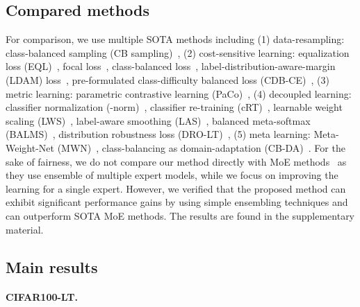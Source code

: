 \documentclass[10pt,twocolumn,letterpaper]{article}
\begin{document}
\subsection{Compared methods}
For comparison, we use multiple SOTA methods including (1) data-resampling: class-balanced sampling (CB sampling)~\cite{decoupling}, (2) cost-sensitive learning: equalization loss (EQL)~\cite{eqlloss}, focal loss~\cite{focalloss}, class-balanced loss~\cite{classbalancedloss}, label-distribution-aware-margin (LDAM) loss~\cite{ldam-drw}, pre-formulated class-difficulty balanced loss (CDB-CE)~\cite{cdb-ce}, (3) metric learning: parametric contrastive learning (PaCo)~\cite{PaCo}, (4) decoupled learning: classifier normalization (-norm)~\cite{decoupling}, classifier re-training (cRT)~\cite{decoupling}, learnable weight scaling (LWS)~\cite{decoupling}, label-aware smoothing (LAS)~\cite{mislas}, balanced meta-softmax (BALMS)~\cite{BALMS}, distribution robustness loss (DRO-LT)~\cite{dro-lt}, (5) meta learning: Meta-Weight-Net (MWN)~\cite{meta-weight-net}, class-balancing as domain-adaptation (CB-DA)~\cite{jamal}. 
For the sake of fairness, we do not compare our method directly with MoE methods~\cite{RIDE,LFME} as they use ensemble of multiple expert models, while we focus on improving the learning for a single expert. 
However, we verified that the proposed method can exhibit significant performance gains by using simple ensembling techniques and can 
outperform SOTA MoE methods. The results are found in the supplementary
material.









\subsection{Main results}
\label{sec:main_results}
\paragraph{\bf CIFAR100-LT.} 
\end{document}
